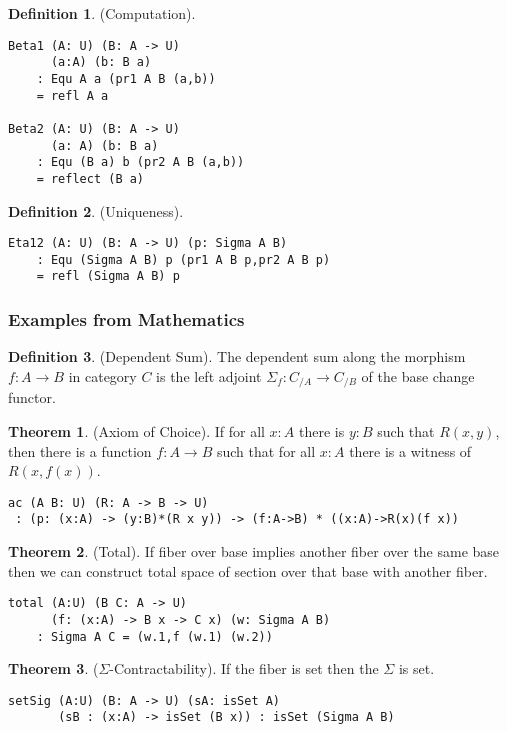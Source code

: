 \documentclass{article}
\theoremstyle{definition}
\newtheorem{definition}{Definition}
\newtheorem{theorem}{Theorem}
\begin{document}
\begin{definition} (Computation).
\begin{lstlisting}
Beta1 (A: U) (B: A -> U)
      (a:A) (b: B a)
    : Equ A a (pr1 A B (a,b))
    = refl A a

Beta2 (A: U) (B: A -> U)
      (a: A) (b: B a)
    : Equ (B a) b (pr2 A B (a,b))
    = reflect (B a)
\end{lstlisting}
\end{definition}

\begin{definition} (Uniqueness).
\begin{lstlisting}
Eta12 (A: U) (B: A -> U) (p: Sigma A B)
    : Equ (Sigma A B) p (pr1 A B p,pr2 A B p)
    = refl (Sigma A B) p
\end{lstlisting}
\end{definition}

\newpage
\subsubsection*{Examples from Mathematics}

\begin{definition} (Dependent Sum).
The dependent sum along the morphism $f: A \rightarrow B$ in category $C$ is the left
adjoint $\Sigma_f : C_{/A} \rightarrow C_{/B}$ of the base change functor.
\end{definition}

\begin{theorem} (Axiom of Choice).
If for all $x : A$ there is $y : B$ such that $R(x,y)$,
then there is a function $f : A \rightarrow B$
such that for all $x : A$ there is a witness of $R(x,f(x))$.
\begin{lstlisting}
ac (A B: U) (R: A -> B -> U)
 : (p: (x:A) -> (y:B)*(R x y)) -> (f:A->B) * ((x:A)->R(x)(f x))
\end{lstlisting}
\end{theorem}

\begin{theorem} (Total).
If fiber over base implies another fiber
over the same base then we can construct total space of section
over that base with another fiber.
\begin{lstlisting}
total (A:U) (B C: A -> U)
      (f: (x:A) -> B x -> C x) (w: Sigma A B)
    : Sigma A C = (w.1,f (w.1) (w.2))
\end{lstlisting}
\end{theorem}

\begin{theorem} ($\Sigma$-Contractability). If the fiber is set then the $\Sigma$ is set.
\begin{lstlisting}
setSig (A:U) (B: A -> U) (sA: isSet A)
       (sB : (x:A) -> isSet (B x)) : isSet (Sigma A B)
\end{lstlisting}
\end{theorem}
\end{document}
